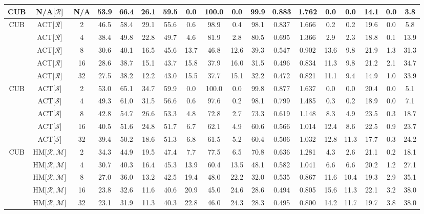 \begin{table*}
{\begin{tabular}{c|cc|cccc|ccccc|ccccc|c}
CUB & N/A{[}$\mathcal{R}${]} & N/A & 53.9 & 66.4 & 26.1 & 59.5 & 0.0 & 100.0 & 0.0 & 99.9 & 0.883 & 1.762 & 0.0 & 0.0 & 14.1 & 0.0 & 3.8\tabularnewline
\hline
\multirow{5}{*}{CUB} & ACT{[}$\mathcal{R}${]}\cite{robrank} & 2 & 46.5 & 58.4 & 29.1 & 55.6 & 0.6 & 98.9 & 0.4 & 98.1 & 0.837 & 1.666 & 0.2 & 0.2 & 19.6 & 0.0 & 5.8\tabularnewline
 & ACT{[}$\mathcal{R}${]}\cite{robrank} & 4 & 38.4 & 49.8 & 22.8 & 49.7 & 4.6 & 81.9 & 2.8 & 80.5 & 0.695 & 1.366 & 2.9 & 2.3 & 18.8 & 0.1 & 13.9\tabularnewline
 & ACT{[}$\mathcal{R}${]}\cite{robrank} & 8 & 30.6 & 40.1 & 16.5 & 45.6 & 13.7 & 46.8 & 12.6 & 39.3 & 0.547 & 0.902 & 13.6 & 9.8 & 21.9 & 1.3 & 31.3\tabularnewline
 & ACT{[}$\mathcal{R}${]}\cite{robrank} & 16 & 28.6 & 38.7 & 15.1 & 43.7 & 15.8 & 37.9 & 16.0 & 31.5 & 0.496 & 0.834 & 11.3 & 9.8 & 21.2 & 2.1 & 34.7\tabularnewline
 & ACT{[}$\mathcal{R}${]}\cite{robrank} & 32 & 27.5 & 38.2 & 12.2 & 43.0 & 15.5 & 37.7 & 15.1 & 32.2 & 0.472 & 0.821 & 11.1 & 9.4 & 14.9 & 1.0 & 33.9\tabularnewline
\hline
\multirow{5}{*}{CUB} & ACT{[}$\mathcal{S}${]}\cite{robrank} & 2 & 53.0 & 65.1 & 34.7 & 59.9 & 0.0 & 100.0 & 0.0 & 99.8 & 0.877 & 1.637 & 0.0 & 0.0 & 20.4 & 0.0 & 5.1\tabularnewline
 & ACT{[}$\mathcal{S}${]}\cite{robrank} & 4 & 49.3 & 61.0 & 31.5 & 56.6 & 0.6 & 97.6 & 0.2 & 98.1 & 0.799 & 1.485 & 0.3 & 0.2 & 18.9 & 0.0 & 7.1\tabularnewline
 & ACT{[}$\mathcal{S}${]}\cite{robrank} & 8 & 42.8 & 54.7 & 26.6 & 53.3 & 4.8 & 72.8 & 2.7 & 73.3 & 0.619 & 1.148 & 8.3 & 4.9 & 23.5 & 0.3 & 18.7\tabularnewline
 & ACT{[}$\mathcal{S}${]}\cite{robrank} & 16 & 40.5 & 51.6 & 24.8 & 51.7 & 6.7 & 62.1 & 4.9 & 60.6 & 0.566 & 1.014 & 12.4 & 8.6 & 22.5 & 0.9 & 23.7\tabularnewline
 & ACT{[}$\mathcal{S}${]}\cite{robrank} & 32 & 39.4 & 50.2 & 18.6 & 51.3 & 6.8 & 61.5 & 5.2 & 60.4 & 0.506 & 1.032 & 12.8 & 11.3 & 17.7 & 0.3 & 24.2\tabularnewline
\hline
\multirow{5}{*}{CUB} & HM{[}$\mathcal{R},\mathcal{M}${]} & 2 & 34.3 & 44.9 & 19.5 & 47.4 & 7.7 & 77.5 & 6.5 & 70.8 & 0.636 & 1.281 & 4.3 & 2.6 & 21.1 & 0.2 & 18.1\tabularnewline
 & HM{[}$\mathcal{R},\mathcal{M}${]} & 4 & 30.7 & 40.3 & 16.4 & 45.3 & 13.9 & 60.4 & 13.5 & 48.1 & 0.582 & 1.041 & 6.6 & 6.6 & 20.2 & 1.2 & 27.1\tabularnewline
 & HM{[}$\mathcal{R},\mathcal{M}${]} & 8 & 27.0 & 36.0 & 13.2 & 42.5 & 19.4 & 48.0 & 22.2 & 32.0 & 0.535 & 0.867 & 11.6 & 10.4 & 19.3 & 2.9 & 35.1\tabularnewline
 & HM{[}$\mathcal{R},\mathcal{M}${]}  & 16 & 23.8 & 32.6 & 11.6 & 40.6 & 20.9 & 45.0 & 24.6 & 28.6 & 0.494 & 0.805 & 15.6 & 11.3 & 22.1 & 3.2 & 38.0\tabularnewline
 & HM{[}$\mathcal{R},\mathcal{M}${]} & 32 & 23.1 & 31.9 & 11.3 & 40.3 & 22.8 & 46.0 & 24.3 & 28.3 & 0.495 & 0.800 & 14.2 & 11.7 & 19.7 & 3.8 & 38.0\tabularnewline

\end{tabular}}
\end{table*}
